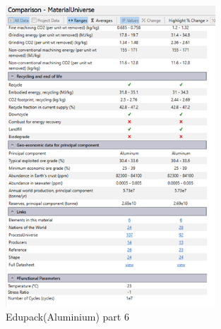                     \begin{figure}[htbp]
                        \centering
                        \includegraphics[width=0.7\textwidth]{figures/Appendix-Mats/Fig6Alu.png}
                        \caption*{Edupack(Aluminium) part 6} 
                        \label{fig:Alu5}
                        \end{figure}
  

